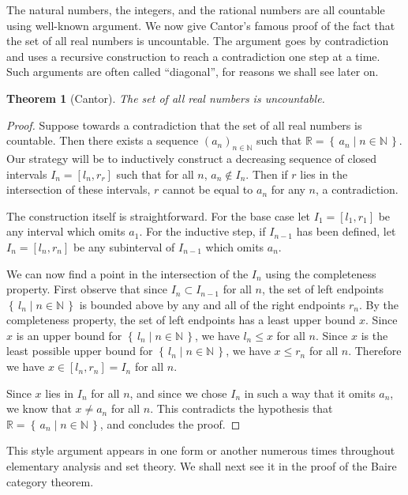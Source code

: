 \documentclass[11pt,oneside,a4paper]{amsbook}
\newcommand{\set}[1]{\left\{\,#1\,\right\}}
\newcommand{\N}{\mathbb N}
\newcommand{\R}{\mathbb R}
\theoremstyle{definition}
\theoremstyle{plain}
\newtheorem{theorem}{Theorem}[section]
\theoremstyle{definition}
\theoremstyle{remark}
\numberwithin{equation}{section}
\numberwithin{figure}{section}
\begin{document}
The natural numbers, the integers, and the rational numbers are all countable using well-known argument. We now give Cantor's famous proof of the fact that the set of all real numbers is uncountable. The argument goes by contradiction and uses a recursive construction to reach a contradiction one step at a time. Such arguments are often called ``diagonal'', for reasons we shall see later on.

\begin{theorem}[Cantor]
  \label{thm:cantor}
  The set of all real numbers is uncountable.
\end{theorem}

\begin{proof}
  Suppose towards a contradiction that the set of all real numbers is countable. Then there exists a sequence $(a_n)_{n\in\N}$ such that $\R=\set{a_n\mid n\in\N}$. Our strategy will be to inductively construct a decreasing sequence of closed intervals $I_n=[l_n,r_r]$ such that for all $n$, $a_n\notin I_n$. Then if $r$ lies in the intersection of these intervals, $r$ cannot be equal to $a_n$ for any $n$, a contradiction.

The construction itself is straightforward. For the base case let $I_1=[l_1,r_1]$ be any interval which omits $a_1$. For the inductive step, if $I_{n-1}$ has been defined, let $I_n=[l_n,r_n]$ be any subinterval of $I_{n-1}$ which omits $a_n$.

We can now find a point in the intersection of the $I_n$ using the completeness property. First observe that since $I_n\subset I_{n-1}$ for all $n$, the set of left endpoints $\set{l_n\mid n\in\N}$ is bounded above by any and all of the right endpoints $r_n$. By the completeness property, the set of left endpoints has a least upper bound $x$. Since $x$ is an upper bound for $\set{l_n\mid n\in\N}$, we have $l_n\leq x$ for all $n$. Since $x$ is the least possible upper bound for $\set{l_n\mid n\in\N}$, we have $x\leq r_n$ for all $n$. Therefore we have $x\in[l_n,r_n]=I_n$ for all $n$.

Since $x$ lies in $I_n$ for all $n$, and since we chose $I_n$ in such a way that it omits $a_n$, we know that $x\neq a_n$ for all $n$. This contradicts the hypothesis that $\R=\set{a_n\mid n\in\N}$, and concludes the proof.
\end{proof}

This style argument appears in one form or another numerous times throughout elementary analysis and set theory. We shall next see it in the proof of the Baire category theorem.
\end{document}
